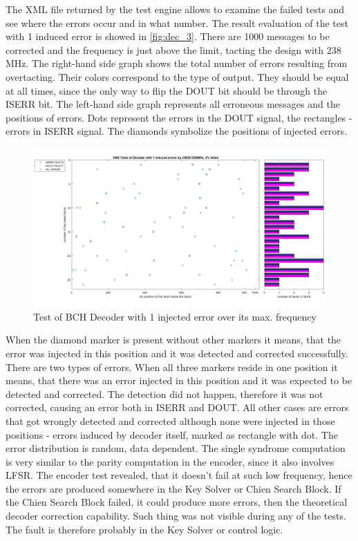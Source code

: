 The XML file returned by the test engine allows to examine the failed tests and see where the errors occur and in what number. The result evaluation of the test with 1 induced error is showed in \autoref{fig:dec_3}. There are 1000 messages to be corrected and the frequency is just above the limit, tacting the design with 238 MHz. The right-hand side graph shows the total number of errors resulting from overtacting. Their colors correspond to the type of output. They should be equal at all times, since the only way to flip the DOUT bit should be through the ISERR bit. The left-hand side graph represents all erroneous messages and the positions of errors. Dots represent the errors in the DOUT signal, the rectangles - errors in ISERR signal. The diamonds symbolize the positions of injected errors.

\begin{figure}[h]
\centering
\includegraphics[width=\textwidth]{figures/1000_tests_1_faults_238_MHz.png}
\caption{Test of BCH Decoder with 1 injected error over its max. frequency}
\label{fig:dec_3}
\end{figure}

When the diamond marker is present without other markers it means, that the error was injected in this position and it was detected and corrected successfully. There are two types of errors. When all three markers reside in one position it means, that there was an error injected in this position and it was expected to be detected and corrected. The detection did not happen, therefore it was not corrected, causing an error both in ISERR and DOUT. All other cases are errors that got wrongly detected and corrected although none were injected in those positions - errors induced by decoder itself, marked as rectangle with dot. The error distribution is random, data dependent. The single syndrome computation is very similar to the parity computation in the encoder, since it also involves LFSR. The encoder test revealed, that it doesn't fail at such low frequency, hence the errors are produced somewhere in the Key Solver or Chien Search Block. If the Chien Search Block failed, it could produce more errors, then the theoretical decoder correction capability. Such thing was not visible during any of the tests. The fault is therefore probably in the Key Solver or control logic.

